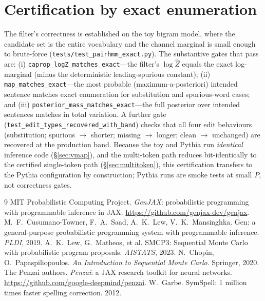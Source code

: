 \documentclass[11pt]{article}
\providecommand{\code}[1]{\texttt{#1}}
\begin{document}
\section{Certification by exact enumeration}
\label{sec:certification}

The filter's correctness is established on the toy bigram model, where the candidate set is the entire vocabulary and the channel marginal is small enough to brute-force (\code{tests/\allowbreak test\_pairhmm\_exact.py}). The substantive gates that pass are: (i) \code{caprop\_logZ\_\allowbreak matches\_exact}---the filter's $\log\widehat Z$ equals the exact log-marginal (minus the deterministic leading-spurious constant); (ii) \code{map\_matches\_exact}---the most probable (maximum-a-posteriori) intended sentence matches exact enumeration for substitution and spurious-word cases; and (iii) \code{posterior\_mass\_\allowbreak matches\_exact}---the full posterior over intended sentences matches in total variation. A further gate (\code{test\_edit\_types\_\allowbreak recovered\_with\_band}) checks that all four edit behaviours (substitution; spurious $\to$ shorter; missing $\to$ longer; clean $\to$ unchanged) are recovered at the production band. Because the toy and Pythia run \emph{identical} inference code (\S\ref{sec:vmap}), and the multi-token path reduces bit-identically to the certified single-token path (\S\ref{sec:multitoken}), this certification transfers to the Pythia configuration by construction; Pythia runs are smoke tests at small $P$, not correctness gates.

\ifdefined\ncincluded\else
\begin{thebibliography}{9}
 MIT Probabilistic Computing Project. \emph{GenJAX}: probabilistic programming with
programmable inference in JAX. \url{https://github.com/genjax-dev/genjax}.
 M.~F.~Cusumano-Towner, F.~A.~Saad, A.~K.~Lew, V.~K.~Mansinghka. Gen: a general-purpose
probabilistic programming system with programmable inference. \emph{PLDI}, 2019.
 A.~K.~Lew, G.~Matheos, et al. SMCP3: Sequential Monte Carlo with probabilistic program
proposals. \emph{AISTATS}, 2023.
 N.~Chopin, O.~Papaspiliopoulos. \emph{An Introduction to Sequential Monte Carlo}.
Springer, 2020.
 The Penzai authors. \emph{Penzai}: a JAX research toolkit for neural networks.
\url{https://github.com/google-deepmind/penzai}.
 W.~Garbe. SymSpell: 1 million times faster spelling correction. 2012.
\end{thebibliography}
\fi

\ifdefined\ncincluded\else
\end{document}

